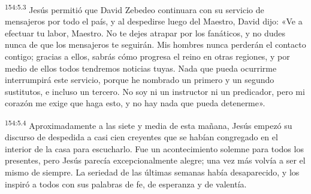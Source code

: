 \par 
\textsuperscript{154:5.3} Jesús permitió que David Zebedeo continuara con su servicio de mensajeros por todo el país, y al despedirse luego del Maestro, David dijo: «Ve a efectuar tu labor, Maestro. No te dejes atrapar por los fanáticos, y no dudes nunca de que los mensajeros te seguirán. Mis hombres nunca perderán el contacto contigo; gracias a ellos, sabrás cómo progresa el reino en otras regiones, y por medio de ellos todos tendremos noticias tuyas. Nada que pueda ocurrirme interrumpirá este servicio, porque he nombrado un primero y un segundo sustitutos, e incluso un tercero. No soy ni un instructor ni un predicador, pero mi corazón me exige que haga esto, y no hay nada que pueda detenerme».

\par 
\textsuperscript{154:5.4} Aproximadamente a las siete y media de esta mañana, Jesús empezó su discurso de despedida a casi cien creyentes que se habían congregado en el interior de la casa para escucharlo. Fue un acontecimiento solemne para todos los presentes, pero Jesús parecía excepcionalmente alegre; una vez más volvía a ser el mismo de siempre. La seriedad de las últimas semanas había desaparecido, y los inspiró a todos con sus palabras de fe, de esperanza y de valentía.

